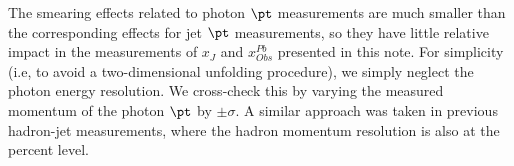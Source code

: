 The smearing effects related to photon $\pt$ measurements are much smaller than the corresponding effects for jet $\pt$ measurements, so they have little relative impact in the measurements of $x_{J}$ and $x_{Obs}^{Pb}$ presented in this note. For simplicity (i.e, to avoid a two-dimensional unfolding procedure), we simply neglect the photon energy resolution. We cross-check this by varying the measured momentum of the photon $\pt$ by $\pm\sigma$. A similar approach was taken in previous hadron-jet measurements, where the hadron momentum resolution is also at the percent level.  